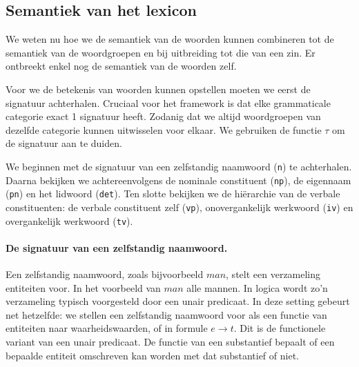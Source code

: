 
\subsection{Semantiek van het lexicon} We weten nu hoe we de semantiek van de woorden kunnen combineren tot de semantiek van de woordgroepen en bij uitbreiding tot die van een zin. Er ontbreekt enkel nog de semantiek van de woorden zelf.

Voor we de betekenis van woorden kunnen opstellen moeten we eerst de signatuur achterhalen. Cruciaal voor het framework is dat elke grammaticale categorie exact 1 signatuur heeft. Zodanig dat we altijd woordgroepen van dezelfde categorie kunnen uitwisselen voor elkaar. We gebruiken de functie $\tau$ om de signatuur aan te duiden.

We beginnen met de signatuur van een zelfstandig naamwoord (\texttt{n}) te achterhalen. Daarna bekijken we achtereenvolgens de nominale constituent (\texttt{np}), de eigennaam (\texttt{pn}) en het lidwoord (\texttt{det}). Ten slotte bekijken we de hiërarchie van de verbale constituenten: de verbale constituent zelf (\texttt{vp}), onovergankelijk werkwoord (\texttt{iv}) en overgankelijk werkwoord (\texttt{tv}).

\paragraph{De signatuur van een zelfstandig naamwoord.} Een zelfstandig naamwoord, zoals bijvoorbeeld $\mathit{man}$, stelt een verzameling entiteiten voor. In het voorbeeld van $\mathit{man}$ alle mannen. In logica wordt zo'n verzameling typisch voorgesteld door een unair predicaat. In deze setting gebeurt net hetzelfde: we stellen een zelfstandig naamwoord voor als een functie van entiteiten naar waarheidswaarden, of in formule $e \to t$. Dit is de functionele variant van een unair predicaat. De functie van een substantief bepaalt of een bepaalde entiteit omschreven kan worden met dat substantief of niet.


